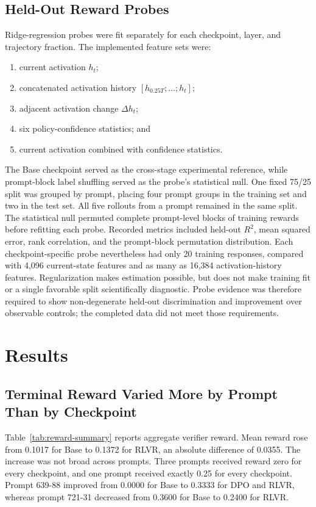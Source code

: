 \documentclass[manuscript,screen,nonacm]{acmart}
\newif\ifpaperfigures
\begin{document}
\subsection{Held-Out Reward Probes}

Ridge-regression probes were fit separately for each checkpoint, layer, and
trajectory fraction. The implemented feature sets were:

\begin{enumerate}
    \item current activation $h_t$;
    \item concatenated activation history $[h_{0.25T};\ldots;h_t]$;
    \item adjacent activation change $\Delta h_t$;
    \item six policy-confidence statistics; and
    \item current activation combined with confidence statistics.
\end{enumerate}

The Base checkpoint served as the cross-stage experimental reference, while
prompt-block label shuffling served as the probe's statistical null. One fixed
75/25 split was grouped by prompt, placing four prompt groups in the
training set and two in the test set. All five rollouts from a prompt remained
in the same split. The statistical null permuted complete prompt-level blocks
of training rewards before refitting each probe. Recorded metrics included
held-out $R^2$, mean squared error, rank correlation, and the prompt-block
permutation distribution. Each checkpoint-specific probe nevertheless had only
20 training responses, compared with 4,096 current-state features and as many
as 16,384 activation-history features. Regularization makes estimation
possible, but does not make training fit or a single favorable split
scientifically diagnostic. Probe evidence was therefore required to show
non-degenerate held-out discrimination and improvement over observable
controls; the completed data did not meet those requirements.

\section{Results}

\subsection{Terminal Reward Varied More by Prompt Than by Checkpoint}

Table~\ref{tab:reward-summary} reports aggregate verifier reward. Mean reward
rose from 0.1017 for Base to 0.1372 for RLVR, an absolute difference of 0.0355.
The increase was not broad across prompts. Three prompts received reward zero
for every checkpoint, and one prompt received exactly 0.25 for every
checkpoint. Prompt 639-88 improved from 0.0000 for Base to 0.3333 for DPO and
RLVR, whereas prompt 721-31 decreased from 0.3600 for Base to 0.2400 for RLVR.
\ifpaperfigures
Figure~\ref{fig:executive-summary} displays this heterogeneity.
\fi
\end{document}
